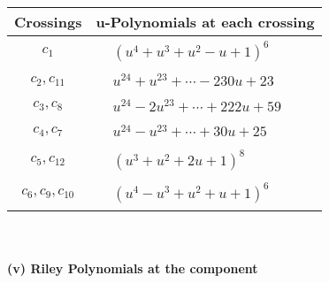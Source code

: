 \documentclass[1p]{elsarticle_modified}
\theoremstyle{definition}
\begin{document}
\begin{tabular}{m{50pt}|m{274pt}}
Crossings & \hspace{64pt}u-Polynomials at each crossing \\
\hline $$\begin{aligned}c_{1}\end{aligned}$$&$\begin{aligned}
&(u^4+u^3+u^2- u+1)^6
\end{aligned}$\\
\hline $$\begin{aligned}c_{2},c_{11}\end{aligned}$$&$\begin{aligned}
&u^{24}+u^{23}+\cdots-230 u+23
\end{aligned}$\\
\hline $$\begin{aligned}c_{3},c_{8}\end{aligned}$$&$\begin{aligned}
&u^{24}-2 u^{23}+\cdots+222 u+59
\end{aligned}$\\
\hline $$\begin{aligned}c_{4},c_{7}\end{aligned}$$&$\begin{aligned}
&u^{24}- u^{23}+\cdots+30 u+25
\end{aligned}$\\
\hline $$\begin{aligned}c_{5},c_{12}\end{aligned}$$&$\begin{aligned}
&(u^3+u^2+2 u+1)^8
\end{aligned}$\\
\hline $$\begin{aligned}c_{6},c_{9},c_{10}\end{aligned}$$&$\begin{aligned}
&(u^4- u^3+u^2+u+1)^6
\end{aligned}$\\
\hline
\end{tabular}\\~\\
\newpage\renewcommand{\arraystretch}{1}
\flushleft \textbf{(v) Riley Polynomials at the component}\newline \\
\end{document}
